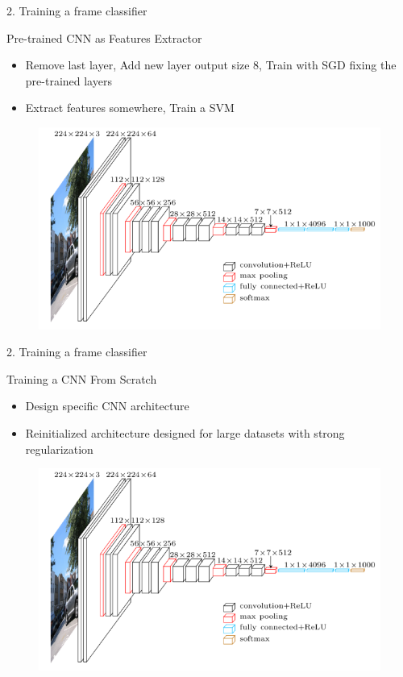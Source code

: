 \begin{frame}{2. Training a frame classifier}
	
	\begin{block}{\small Pre-trained CNN as Features Extractor}
	\begin{itemize}
		\item Remove last layer, Add new layer output size 8, Train with SGD fixing the pre-trained layers
		\item Extract features somewhere, Train a SVM
	\end{itemize}
	\end{block}
	
	\begin{figure}[h]
		\centering
		\includegraphics[width=.70\linewidth]{images/vgg16.png}
	\end{figure}

\end{frame}

\begin{frame}{2. Training a frame classifier}

	\begin{block}{\small Training a CNN From Scratch}
	\begin{itemize}
		\item Design specific CNN architecture
		\item Reinitialized architecture designed for large datasets with strong regularization
	\end{itemize}
	\end{block}
	
	\begin{figure}[h]
		\centering
		\includegraphics[width=.79\linewidth]{images/vgg16.png}
	\end{figure}
	
\end{frame}


